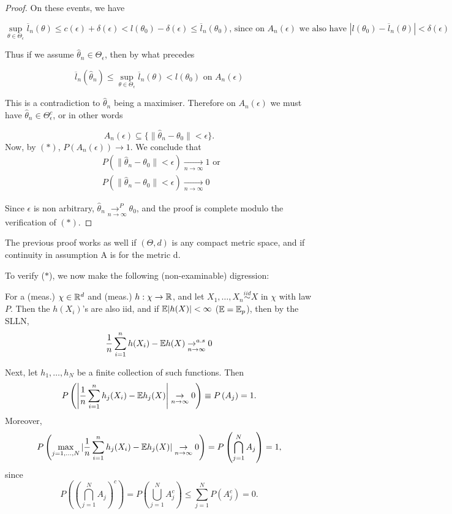 \documentclass[a4paper]{article}
\begin{document}
\begin{proof}
	On these events, we have 

	\[
		\sup_{\theta \in \Theta_{\epsilon}} \overline{l}_n (\theta) \le  c(\epsilon) + \delta(\epsilon) < l(\theta_0) - \delta(\epsilon) \le \overline{l}_n(\theta_{0}) \text{, since on $A_n(\epsilon)$ we also have } |l(\theta_0) - \overline{l}_n(\theta)| < \delta(\epsilon)
	\] 

	Thus if we assume $\hat{\theta}_n \in \Theta_{\epsilon}$, then by what precedes

	\[
		\overline{l}_n(\hat{\theta}_n) \le  \sup_{\theta \in \Theta_{\epsilon}} \overline{l}_n(\theta) < l(\theta_0) \text{ on } A_n(\epsilon)
	\]

	This is a contradiction to $\hat{\theta}_n$ being a maximiser. Therefore on $A_n(\epsilon)$ we must have  $\hat{\theta}_n \in  \Theta_{\epsilon}^{c}$, or in other words

	\[
		A_n(\epsilon) \subseteq \{\| \hat{\theta}_n - \theta_0\| < \epsilon\} 
	.\] 
	Now, by $(\ast)$,  $P\left( A_n(\epsilon) \right) \to 1$. We conclude that
	 \begin{align*}
		&P\left( \| \hat{\theta}_n - \theta_0 \| < \epsilon  \right) \underset{n\to \infty}{\to } 1 \text{ or } \\
		&P\left( \| \hat{\theta}_n - \theta_0\| < \epsilon \right) \underset{n\to \infty}{\to } 0
	\end{align*}

	Since $\epsilon$ is non arbitrary,  $\hat{\theta}_n \underset{n\to \infty}{\to^{P} } \theta_0$, and the proof is complete modulo the verification of $(\ast)$.
\end{proof}

\begin{remark}
	The previous proof works as well if $(\Theta, d)$ is any compact metric space, and if continuity in assumption A is for the metric d.
\end{remark}

To verify ($\ast$), we now make the following (non-examinable) digression:

For a (meas.) $\chi \in \mathbb{R}^{d}$ and (meas.) $h: \chi \to \mathbb{R}$, and let $X_1, \ldots, X_n \stackrel{iid}{\sim} X$ in $\chi$ with law $P$. Then the $h(X_i)$'s are also iid, and if $\mathbb{E} |h(X)| < \infty$ ($\mathbb{E} = \mathbb{E}_p$), then by the SLLN,
\[
	\frac{1}{n} \sum_{i=1}^{n} h(X_i) - \mathbb{E} h(X) \underset{n \to \infty}{\to^{a.s}} 0 
\] 

Next, let $h_1, \ldots, h_N$ be a finite collection of such functions. Then
\[
	P\left( \left|\frac{1}{n} \sum_{i=1}^{n} h_j (X_i) - \mathbb{E} h_j (X)  \right| \underset{n \to \infty}{\to} 0 \right) \equiv P\left( A_j \right) = 1.
\] 
Moreover,
\[
	P\left( \max_{j=1,\ldots,N} |\frac{1}{n} \sum_{i=1}^{n} h_j (X_i) - \mathbb{E} h_j (X)  | \underset{n \to \infty}{\to} 0 \right) = P\left( \bigcap_{j=1}^{N} A_j  \right) = 1,
\] since
\[
	P\left( \left(\bigcap_{j=1}^{N}A_j\right)^{c}  \right) = P\left( \bigcup_{j=1}^{N} A_j^{c}  \right) \le \sum_{j=1}^{N}P\left( A_j^{c} \right) = 0.
\] 
\end{document}

